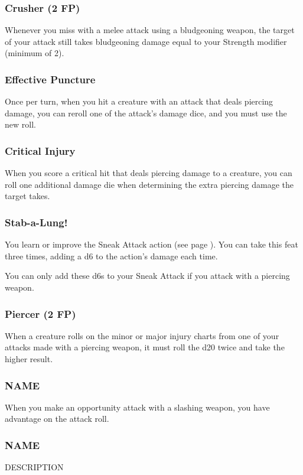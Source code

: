 \subsubsection{Crusher (2 FP)} \label{feat::crusher}
    Whenever you miss with a melee attack using a bludgeoning weapon, the target of your attack still takes bludgeoning damage equal to your Strength modifier (minimum of 2).
\subsubsection{Effective Puncture} \label{feat::effectivepuncture}
    Once per turn, when you hit a creature with an attack that deals piercing damage, you can reroll one of the attack's damage dice, and you must use the new roll.
\subsubsection{Critical Injury} \label{feat::criticalinjury}
    When you score a critical hit that deals piercing damage to a creature, you can roll one additional damage die when determining the extra piercing damage the target takes.
\subsubsection{Stab-a-Lung!} \label{feat::stabalung}
    You learn or improve the Sneak Attack action (see page \pageref{act:sneakattack}).
    You can take this feat three times, adding a d6 to the action's damage each time.

    You can only add these d6s to your Sneak Attack if you attack with a piercing weapon.
\subsubsection{Piercer (2 FP)} \label{feat::piercer}
    When a creature rolls on the minor or major injury charts from one of your attacks made with a piercing weapon, it must roll the d20 twice and take the higher result.
\subsubsection{NAME} \label{feat::name}
    When you make an opportunity attack with a slashing weapon, you have advantage on the attack roll.
\subsubsection{NAME} \label{feat::name}
    DESCRIPTION
